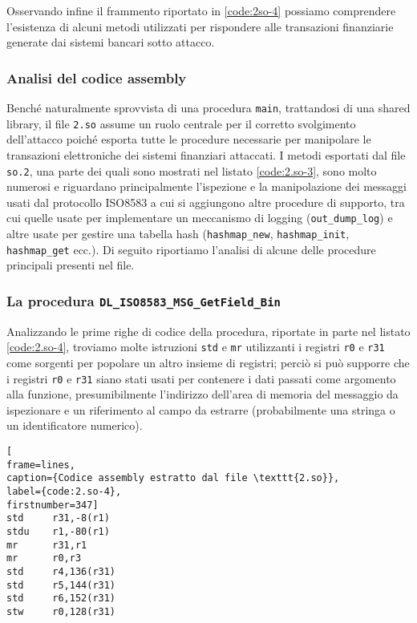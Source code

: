 \documentclass[10pt,a4paper, titlepage]{report}
\begin{document}
Osservando infine il frammento riportato in \ref{code:2so-4} possiamo comprendere l'esistenza di alcuni metodi utilizzati per rispondere alle transazioni finanziarie generate dai sistemi bancari sotto attacco.

\subsubsection{Analisi del codice assembly}

Benché naturalmente sprovvista di una procedura \texttt{main}, trattandosi di una shared library, il file \texttt{2.so} assume un ruolo centrale per il corretto svolgimento dell'attacco poiché esporta tutte le procedure necessarie per manipolare le transazioni elettroniche dei sistemi finanziari attaccati.
I metodi esportati dal file \texttt{so.2}, una parte dei quali sono mostrati nel listato \ref{code:2.so-3}, sono molto numerosi e riguardano principalmente l'ispezione e la manipolazione dei messaggi usati dal protocollo ISO8583 a cui si aggiungono altre procedure di supporto, tra cui quelle usate per implementare un meccanismo di logging (\texttt{out\_dump\_log}) e altre usate per gestire una tabella hash (\texttt{hashmap\_new}, \texttt{hashmap\_init}, \texttt{hashmap\_get} ecc.).
Di seguito riportiamo l'analisi di alcune delle procedure principali presenti nel file.

\subsubsection{La procedura \texttt{DL\_ISO8583\_MSG\_GetField\_Bin}} 

Analizzando le prime righe di codice della procedura, riportate in parte nel listato \ref{code:2.so-4}, troviamo molte istruzioni \texttt{std} e \texttt{mr} utilizzanti i registri \texttt{r0} e \texttt{r31} come sorgenti per popolare un altro insieme di registri; perciò si può supporre che i registri \texttt{r0} e \texttt{r31} siano stati usati per contenere i dati passati come argomento alla funzione, presumibilmente l'indirizzo dell'area di memoria del messaggio da ispezionare e un riferimento al campo da estrarre (probabilmente una stringa o un identificatore numerico).

\begin{lstlisting}[
frame=lines, 
caption={Codice assembly estratto dal file \texttt{2.so}}, 
label={code:2.so-4},
firstnumber=347]
std     r31,-8(r1)
stdu    r1,-80(r1)
mr      r31,r1
mr      r0,r3
std     r4,136(r31)
std     r5,144(r31)
std     r6,152(r31)
stw     r0,128(r31)
\end{lstlisting}
\end{document}
